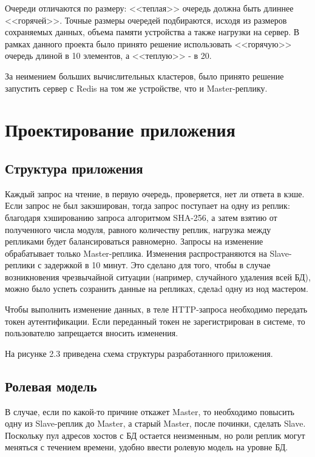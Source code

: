 Очереди отличаются по размеру: <<теплая>> очередь должна быть длиннее <<горячей>>. Точные размеры очередей подбираются, исходя из размеров сохраняемых данных, объема памяти устройства а также нагрузки на сервер. В рамках данного проекта было принято решение использовать <<горячую>> очередь  длиной в 10 элементов, а <<теплую>> - в 20.

За неимением больших вычислительных кластеров, было принято решение запустить сервер с Redis на том же устройстве, что и Master-реплику.


\section{Проектирование приложения}

\subsection{Структура приложения}

Каждый запрос на чтение, в первую очередь, проверяется, нет ли ответа в кэше. Если запрос не был закэширован, тогда запрос поступает на одну из реплик: благодаря хэшированию запроса алгоритмом SHA-256, а затем взятию от полученного числа модуля, равного количеству реплик, нагрузка между репликами будет балансироваться равномерно.
Запросы на изменение обрабатывает только Master-реплика. Изменения распространяются на Slave-реплики с задержкой в 10 минут. Это сделано для того, чтобы в случае возникновения чрезвычайной ситуации (например, случайного удаления всей БД), можно было успеть созранить данные на репликах, сделаd одну из нод мастером.

Чтобы выполнить изменение данных, в теле HTTP-запроса необходимо передать токен аутентификации. Если переданный токен не зарегистрирован в системе, то пользователю запрещается вносить изменения.


На рисунке 2.3 приведена схема структуры разработанного приложения.

\subsection{Ролевая модель}

В случае, если по какой-то причине откажет Master, то необходимо повысить одну из Slave-реплик до Master, а старый Master, после починки, сделать Slave. Поскольку пул адресов хостов с БД остается неизменным, но роли реплик могут меняться с течением времени, удобно ввести ролевую модель на уровне БД.

